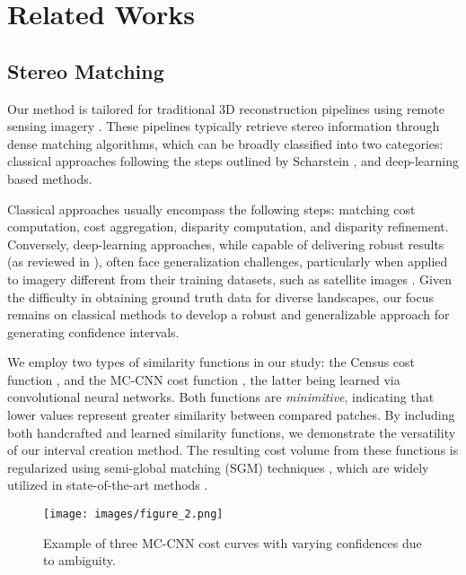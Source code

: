 \section{Related Works}\label{sec:related_works}

\subsection{Stereo Matching}

Our method is tailored for traditional 3D reconstruction pipelines using remote sensing imagery \cite{shean_automated_2016, franchis_automatic_2014, rupnik_micmac_2017, youssefi_cars_2020}. These pipelines typically retrieve stereo information through dense matching algorithms, which can be broadly classified into two categories: classical approaches following the steps outlined by Scharstein \etal \cite{scharstein_taxonomy_2001}, and deep-learning based methods.

Classical approaches usually encompass the following steps: matching cost computation, cost aggregation, disparity computation, and disparity refinement. Conversely, deep-learning approaches, while capable of delivering robust results (as reviewed in \cite{laga_survey_2022}), often face generalization challenges, particularly when applied to imagery different from their training datasets, such as satellite images \cite{mari_disparity_2022}. Given the difficulty in obtaining ground truth data for diverse landscapes, our focus remains on classical methods to develop a robust and generalizable approach for generating confidence intervals.

We employ two types of similarity functions in our study: the Census cost function \cite{goos_non-parametric_1994}, and the MC-CNN cost function \cite{zbontar_stereo_2016}, the latter being learned via convolutional neural networks. Both functions are \textit{minimitive}, indicating that lower values represent greater similarity between compared patches. By including both handcrafted and learned similarity functions, we demonstrate the versatility of our interval creation method. The resulting cost volume from these functions is regularized using semi-global matching (SGM) techniques \cite{hirschmuller_accurate_2005, facciolo_mgm_2015}, which are widely utilized in state-of-the-art methods \cite{chebbi_deepsim-nets_2023}.

\begin{figure}[t]
  \centering
  \texttt{[image: images/figure\_2.png]}
  \caption{Example of three MC-CNN cost curves with varying confidences due to ambiguity.}
  \label{fig:ambiguity}
\end{figure}


